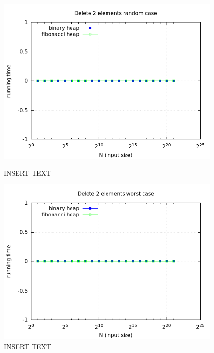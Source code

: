 \documentclass[a4paper,oneside,article,11pt]{memoir}
\begin{document}
\begin{figure}[H]
\centering
\begin{minipage}{0.48\columnwidth}
  \centering
  \includegraphics[width=\linewidth]{../res/delmin/delmin_del_2_time_random.png}%
  \caption{INSERT TEXT}
  \label{fig:delmin_2_random_time}
\end{minipage}%
\hfill
\begin{minipage}{0.48\columnwidth}
  \centering
  \includegraphics[width=\linewidth]{../res/delmin/delmin_del_2_time_worst.png}%
  \caption{INSERT TEXT}
  \label{fig:delmin_2_worst_time}
\end{minipage}
\end{figure}
\end{document}
